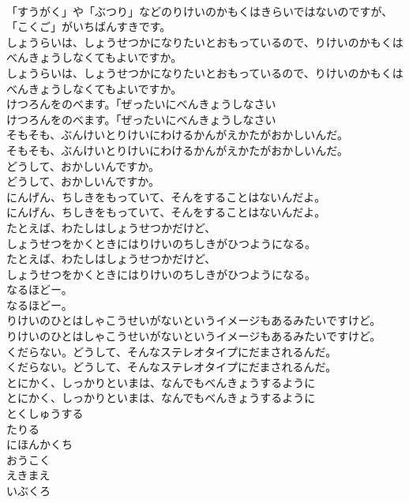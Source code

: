 \documentclass[8pt]{extreport}
\begin{document}
\begin{CJK}{UTF8}{min}
\\	「すうがく」や「ぶつり」などのりけいのかもくはきらいではないのですが、「こくご」がいちばんすきです。
\\	しょうらいは、しょうせつかになりたいとおもっているので、りけいのかもくはべんきょうしなくてもよいですか。
\\	しょうらいは、しょうせつかになりたいとおもっているので、りけいのかもくはべんきょうしなくてもよいですか。
\\	けつろんをのべます。「ぜったいにべんきょうしなさい
\\	けつろんをのべます。「ぜったいにべんきょうしなさい
\\	そもそも、ぶんけいとりけいにわけるかんがえかたがおかしいんだ。
\\	そもそも、ぶんけいとりけいにわけるかんがえかたがおかしいんだ。
\\	どうして、おかしいんですか。
\\	どうして、おかしいんですか。
\\	にんげん、ちしきをもっていて、そんをすることはないんだよ。
\\	にんげん、ちしきをもっていて、そんをすることはないんだよ。
\\	たとえば、わたしはしょうせつかだけど、
\\	しょうせつをかくときにはりけいのちしきがひつようになる。
\\	たとえば、わたしはしょうせつかだけど、
\\	しょうせつをかくときにはりけいのちしきがひつようになる。
\\	なるほどー。
\\	なるほどー。
\\	りけいのひとはしゃこうせいがないというイメージもあるみたいですけど。
\\	りけいのひとはしゃこうせいがないというイメージもあるみたいですけど。
\\	くだらない。どうして、そんなステレオタイプにだまされるんだ。
\\	くだらない。どうして、そんなステレオタイプにだまされるんだ。
\\	とにかく、しっかりといまは、なんでもべんきょうするように
\\	とにかく、しっかりといまは、なんでもべんきょうするように
\\	とくしゅうする
\\	たりる
\\	にほんかくち
\\	おうこく
\\	えきまえ
\\	いぶくろ

\end{CJK}
\end{document}

